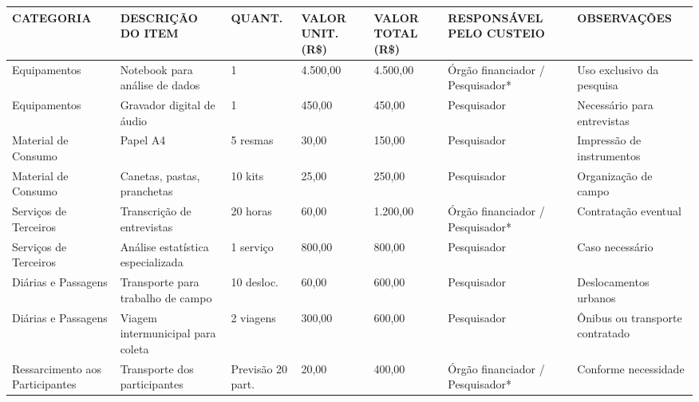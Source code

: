 \documentclass[
  brazilian,
  12pt,
  letterpaper,
  DIV=11,
  numbers=noendperiod]{scrartcl}
\begin{document}
\begin{table}[htbp]
\centering
\scriptsize 
\setlength{\tabcolsep}{3pt} %
\renewcommand{\arraystretch}{1.5}

\begin{tabular}{|p{1.8cm}|p{2.7cm}|p{1.4cm}|p{1.6cm}|p{1.6cm}|p{2.4cm}|p{2.2cm}|}
\hline
\rowcolor[gray]{0.9} 
\textbf{CATEGORIA} & \textbf{DESCRIÇÃO DO ITEM} & \textbf{QUANT.} & \textbf{VALOR UNIT. (R\$)} & \textbf{VALOR TOTAL (R\$)} & \textbf{RESPONSÁVEL PELO CUSTEIO} & \textbf{OBSERVAÇÕES} \\ \hline

Equipamentos & Notebook para análise de dados & 1 & 4.500,00 & 4.500,00 & Órgão financiador / Pesquisador* & Uso exclusivo da pesquisa \\ \hline

Equipamentos & Gravador digital de áudio & 1 & 450,00 & 450,00 & Pesquisador & Necessário para entrevistas \\ \hline

Material de Consumo & Papel A4 & 5 resmas & 30,00 & 150,00 & Pesquisador & Impressão de instrumentos \\ \hline

Material de Consumo & Canetas, pastas, pranchetas & 10 kits & 25,00 & 250,00 & Pesquisador & Organização de campo \\ \hline

Serviços de Terceiros & Transcrição de entrevistas & 20 horas & 60,00 & 1.200,00 & Órgão financiador / Pesquisador* & Contratação eventual \\ \hline

Serviços de Terceiros & Análise estatística especializada & 1 serviço & 800,00 & 800,00 & Pesquisador & Caso necessário \\ \hline

Diárias e Passagens & Transporte para trabalho de campo & 10 desloc. & 60,00 & 600,00 & Pesquisador & Deslocamentos urbanos \\ \hline

Diárias e Passagens & Viagem intermunicipal para coleta & 2 viagens & 300,00 & 600,00 & Pesquisador & Ônibus ou transporte contratado \\ \hline

Ressarcimento aos Participantes & Transporte dos participantes & Previsão 20 part. & 20,00 & 400,00 & Órgão financiador / Pesquisador* & Conforme necessidade \\ \hline


\end{tabular}
\end{table}
\end{document}
